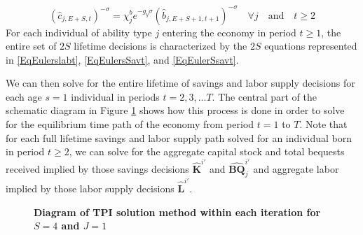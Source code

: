 \documentclass[letterpaper,12pt]{article}
\theoremstyle{definition}
\begin{document}
  \begin{equation}\label{EqEulerSsavt}
    (\hat{c}_{j,E+S,t})^{-\sigma} = \chi^b_j e^{-g_y\sigma}(\hat{b}_{j,E+S+1,t+1})^{-\sigma} \quad\forall j \quad\text{and}\quad t\geq 2
  \end{equation}
  For each individual of ability type $j$ entering the economy in period $t\geq 1$, the entire set of $2S$ lifetime decisions is characterized by the $2S$ equations represented in \eqref{EqEulerslabt}, \eqref{EqEulersSavt}, and \eqref{EqEulerSsavt}.

  We can then solve for the entire lifetime of savings and labor supply decisions for each age $s=1$ individual in periods $t=2,3,...T$. The central part of the schematic diagram in Figure \ref{FigTPIdiag} shows how this process is done in order to solve for the equilibrium time path of the economy from period $t=1$ to $T$. Note that for each full lifetime savings and labor supply path solved for an individual born in period $t\geq 2$, we can solve for the aggregate capital stock and total bequests received implied by those savings decisions $\bm{\hat{K}}^{i'}$ and $\bm{\hat{BQ}}_{j}^{i'}$ and aggregate labor implied by those labor supply decisions $\bm{\hat{L}}^{i'}$.

  \begin{figure}[p]\centering \captionsetup{width=4.0in}
    \caption{\label{FigTPIdiag}\textbf{Diagram of TPI solution method within each iteration for $S=4$ and $J=1$}}
  \end{figure}
\end{document}
